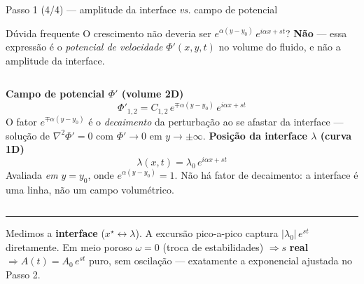 \documentclass[aspectratio=169,11pt]{beamer}
\begin{document}
\begin{frame}{Passo 1 (4/4) — amplitude da interface \emph{vs.} campo de potencial}
  \begin{exampleblock}{Dúvida frequente}
    \footnotesize
    O crescimento não deveria ser $e^{\alpha(y-y_0)}\,e^{i\alpha x + st}$?
    \;\textbf{Não} — essa expressão é o \emph{potencial de velocidade}
    $\Phi'(x,y,t)$ no volume do fluido, e não a amplitude da interface.
  \end{exampleblock}
  \begin{columns}[T]
    \textbf{Campo de potencial $\Phi'$ (volume 2D)}
    \begin{equation*}
      \Phi'_{1,2} = C_{1,2}\,e^{\mp\alpha(y-y_0)}\,e^{i\alpha x + st}
    \end{equation*}
    \footnotesize
    O fator $e^{\mp\alpha(y-y_0)}$ é o \emph{decaimento} da perturbação ao se
    afastar da interface — solução de $\nabla^2\Phi'=0$ com $\Phi'\to0$ em
    $y\to\pm\infty$.
    \textbf{Posição da interface $\lambda$ (curva 1D)}
    \begin{equation*}
      \lambda(x,t) = \lambda_0\,e^{i\alpha x + st}
    \end{equation*}
    \footnotesize
    Avaliada \emph{em} $y=y_0$, onde $e^{\alpha(y-y_0)}=1$. Não há fator de
    decaimento: a interface é uma linha, não um campo volumétrico.
  \end{columns}
  \vspace{0.4em}
  \hrule
  \vspace{0.4em}
  \footnotesize
  Medimos a \textbf{interface} ($x^\star \leftrightarrow \lambda$). A excursão
  pico-a-pico captura $|\lambda_0|\,e^{st}$ diretamente. Em meio poroso
  $\omega=0$ (troca de estabilidades) $\Rightarrow s$ \textbf{real}
  $\Rightarrow A(t)=A_0\,e^{st}$ puro, sem oscilação — exatamente a exponencial
  ajustada no Passo 2.
\end{frame}
\end{document}

